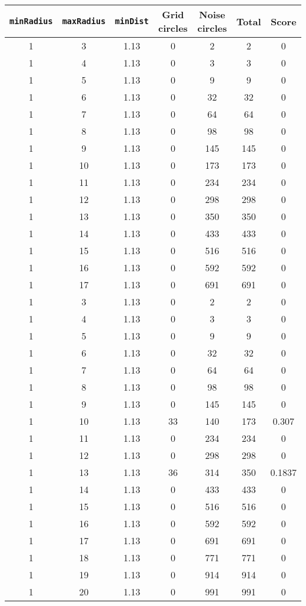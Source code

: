 \documentclass[letterpaper, 12pt]{article}
\begin{document}
\begin{longtable}{|c|c|c|c|c|c|c|}
\hline
\textbf{\texttt{minRadius}} & \textbf{\texttt{maxRadius}} & \textbf{\texttt{minDist}} & \textbf{Grid circles} & \textbf{Noise circles} & \textbf{Total} & \textbf{Score} \\
\hline
1 & 3 & 1.13 & 0 & 2 & 2 & 0 \\
\hline
1 & 4 & 1.13 & 0 & 3 & 3 & 0 \\
\hline
1 & 5 & 1.13 & 0 & 9 & 9 & 0 \\
\hline
1 & 6 & 1.13 & 0 & 32 & 32 & 0 \\
\hline
1 & 7 & 1.13 & 0 & 64 & 64 & 0 \\
\hline
1 & 8 & 1.13 & 0 & 98 & 98 & 0 \\
\hline
1 & 9 & 1.13 & 0 & 145 & 145 & 0 \\
\hline
1 & 10 & 1.13 & 0 & 173 & 173 & 0 \\
\hline
1 & 11 & 1.13 & 0 & 234 & 234 & 0 \\
\hline
1 & 12 & 1.13 & 0 & 298 & 298 & 0 \\
\hline
1 & 13 & 1.13 & 0 & 350 & 350 & 0 \\
\hline
1 & 14 & 1.13 & 0 & 433 & 433 & 0 \\
\hline
1 & 15 & 1.13 & 0 & 516 & 516 & 0 \\
\hline
1 & 16 & 1.13 & 0 & 592 & 592 & 0 \\
\hline
1 & 17 & 1.13 & 0 & 691 & 691 & 0 \\
\hline
1 & 3 & 1.13 & 0 & 2 & 2 & 0 \\
\hline
1 & 4 & 1.13 & 0 & 3 & 3 & 0 \\
\hline
1 & 5 & 1.13 & 0 & 9 & 9 & 0 \\
\hline
1 & 6 & 1.13 & 0 & 32 & 32 & 0 \\
\hline
1 & 7 & 1.13 & 0 & 64 & 64 & 0 \\
\hline
1 & 8 & 1.13 & 0 & 98 & 98 & 0 \\
\hline
1 & 9 & 1.13 & 0 & 145 & 145 & 0 \\
\hline
1 & 10 & 1.13 & 33 & 140 & 173 & 0.307 \\
\hline
1 & 11 & 1.13 & 0 & 234 & 234 & 0 \\
\hline
1 & 12 & 1.13 & 0 & 298 & 298 & 0 \\
\hline
1 & 13 & 1.13 & 36 & 314 & 350 & 0.1837 \\
\hline
1 & 14 & 1.13 & 0 & 433 & 433 & 0 \\
\hline
1 & 15 & 1.13 & 0 & 516 & 516 & 0 \\
\hline
1 & 16 & 1.13 & 0 & 592 & 592 & 0 \\
\hline
1 & 17 & 1.13 & 0 & 691 & 691 & 0 \\
\hline
1 & 18 & 1.13 & 0 & 771 & 771 & 0 \\
\hline
1 & 19 & 1.13 & 0 & 914 & 914 & 0 \\
\hline
1 & 20 & 1.13 & 0 & 991 & 991 & 0 \\
\hline
\end{longtable}
\end{document}
